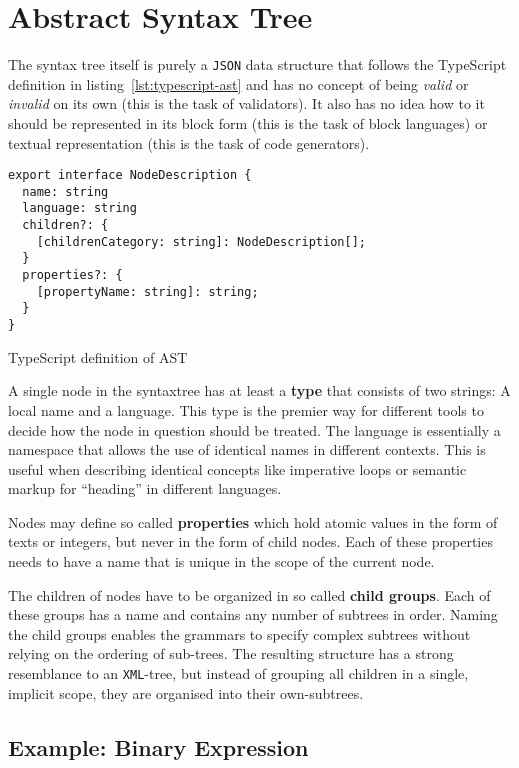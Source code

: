 \documentclass[sigconf,natbib=false,review=true]{acmart}
\begin{document}
\section{Abstract Syntax Tree}

The syntax tree itself is purely a \texttt{JSON} data structure that follows the TypeScript definition in listing~\ref{lst:typescript-ast} and has no concept of being \textit{valid} or \textit{invalid} on its own (this is the task of validators). It also has no idea how to it should be represented in its block form (this is the task of block languages) or textual representation (this is the task of code generators).

\begin{listing}[H]
\begin{verbatim}
export interface NodeDescription {
  name: string
  language: string
  children?: {
    [childrenCategory: string]: NodeDescription[];
  }
  properties?: {
    [propertyName: string]: string;
  }
}
\end{verbatim}
\caption{TypeScript definition of AST}
\label{lst:typescript-ast}
\end{listing}

A single node in the syntaxtree has at least a \textbf{type} that consists of two strings: A local name and a language. This type is the premier way for different tools to decide how the node in question should be treated. The language is essentially a namespace that allows the use of identical names in different contexts. This is useful when describing identical concepts like imperative loops or semantic markup for \enquote{heading} in different languages.

Nodes may define so called \textbf{properties} which hold atomic values in the form of texts or integers, but never in the form of child nodes. Each of these properties needs to have a name that is unique in the scope of the current node.

The children of nodes have to be organized in so called \textbf{child groups}. Each of these groups has a name and contains any number of subtrees in order. Naming the child groups enables the grammars to specify complex subtrees without relying on the ordering of sub-trees. The resulting structure has a strong resemblance to an \texttt{XML}-tree, but instead of grouping all children in a single, implicit scope, they are organised into their own-subtrees.

\subsection{Example: Binary Expression}
\end{document}
